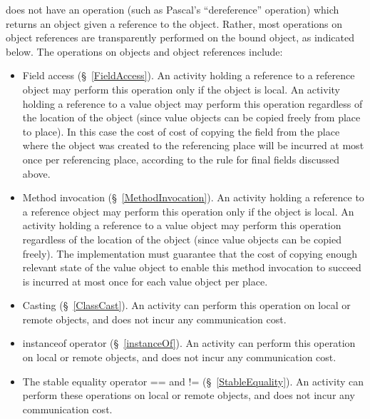 {}\Xten{} does not have an operation (such as Pascal's ``dereference''
operation) which returns an object given a reference to the
object. Rather, most operations on object references are transparently
performed on the bound object, as indicated below. The operations on
objects and object references include:
\begin{itemize}

{}\item Field access (\S~\ref{FieldAccess}). An activity holding a
reference to a reference object may perform this operation only if the
object is local.  An activity holding a reference to a value object
may perform this operation regardless of the location of the object
(since value objects can be copied freely from place to place). In
this case the cost of cost of copying the field from the place where
the object was created to the referencing place will be incurred at
most once per referencing place, according to the rule for final
fields discussed above.

\item Method invocation (\S~\ref{MethodInvocation}). 
An activity holding a reference to a reference object may perform this
operation only if the object is local.  An activity holding a
reference to a value object may perform this operation regardless of
the location of the object (since value objects can be copied
freely). The \Xten{} implementation must guarantee that the cost of
copying enough relevant state of the value object to enable this
method invocation to succeed is incurred at most once for each value
object per place.

{}\item Casting (\S~\ref{ClassCast}).  An activity can perform this
operation on local or remote objects, and does not incur any
communication cost.

{}\item {\cf instanceof} operator (\S~\ref{instanceOf}). 
An activity can perform this
operation on local or remote objects, and does not incur any
communication cost.

\item The stable equality operator {\cf ==} and {\cf !=} (\S~\ref{StableEquality}). An activity can perform these operations on local or remote objects,
and does not incur any communication cost.

\end{itemize}

